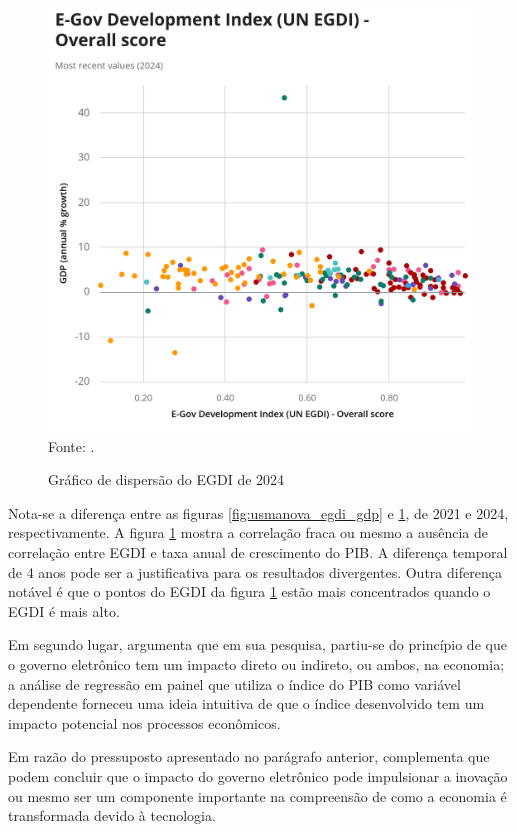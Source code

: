\begin{figure}[H]
	\centering
	\caption{Gráfico de dispersão do EGDI de 2024}
	\includegraphics[width=1\linewidth]{figuras/UN_EGDI_EGDI_scatter}
	\label{fig:UN_EGDI_EGDI_scatter}
	\footnotesize{Fonte: \cite{scatterplot_egdi_2024}.}
\end{figure}

Nota-se a diferença entre as figuras \ref{fig:usmanova_egdi_gdp} e \ref{fig:UN_EGDI_EGDI_scatter}, de 2021 e 2024, respectivamente. A figura \ref{fig:UN_EGDI_EGDI_scatter} mostra a correlação fraca ou mesmo a ausência de correlação entre EGDI e taxa anual de crescimento do PIB. A diferença temporal de 4 anos pode ser a justificativa para os resultados divergentes. Outra diferença notável é que o pontos do EGDI da figura \ref{fig:UN_EGDI_EGDI_scatter} estão mais concentrados quando o EGDI é mais alto.

Em segundo lugar, \cite{kotenok2020government} argumenta que em sua pesquisa, partiu-se do princípio de que o governo eletrônico tem um impacto direto ou indireto, ou ambos, na economia; a análise de regressão em painel que utiliza o índice do PIB como variável dependente forneceu uma ideia intuitiva de que o índice desenvolvido tem um impacto potencial nos processos econômicos.

Em razão do pressuposto apresentado no parágrafo anterior, \cite{kotenok2020government} complementa que podem concluir
que o impacto do governo eletrônico pode impulsionar a inovação ou
mesmo ser um componente importante na compreensão de como a
economia é transformada devido à tecnologia.

